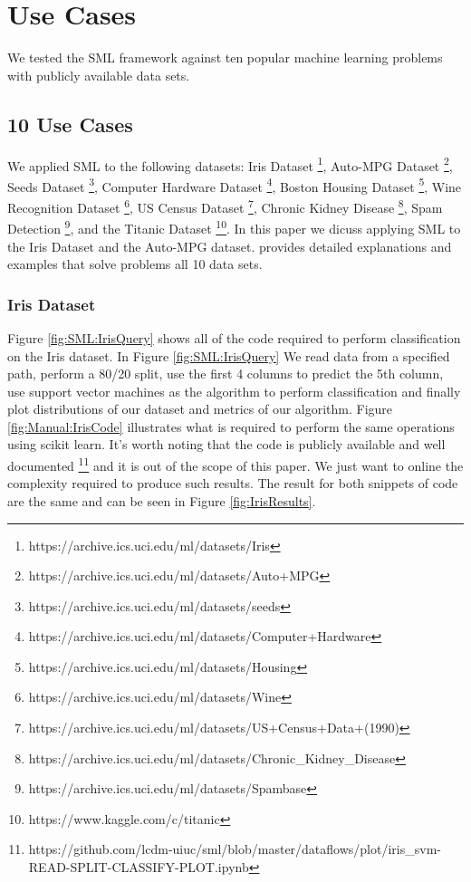 \documentclass[jair,twoside,11pt,theapa]{article}
\begin{document}
\section{Use Cases}
\label{use-cases}

We tested the SML framework against ten popular machine learning problems with publicly available data sets.

\subsection{10 Use Cases}
We applied SML to the following datasets: Iris Dataset \footnote{https://archive.ics.uci.edu/ml/datasets/Iris}, Auto-MPG Dataset \footnote{https://archive.ics.uci.edu/ml/datasets/Auto+MPG}, Seeds Dataset \footnote{https://archive.ics.uci.edu/ml/datasets/seeds}, Computer Hardware Dataset \footnote{https://archive.ics.uci.edu/ml/datasets/Computer+Hardware}, Boston Housing Dataset \footnote{https://archive.ics.uci.edu/ml/datasets/Housing}, Wine Recognition Dataset \footnote{https://archive.ics.uci.edu/ml/datasets/Wine}, US Census Dataset \footnote{https://archive.ics.uci.edu/ml/datasets/US+Census+Data+(1990)}, Chronic Kidney Disease \footnote{https://archive.ics.uci.edu/ml/datasets/Chronic\_Kidney\_Disease}, Spam Detection \footnote{https://archive.ics.uci.edu/ml/datasets/Spambase}, and the Titanic Dataset \footnote{https://www.kaggle.com/c/titanic}. In this paper we dicuss applying SML to the Iris Dataset and the Auto-MPG dataset. \cite{Github:DataFlows} provides detailed explanations and examples that solve problems all 10 data sets.

\subsubsection{Iris Dataset}
Figure \ref{fig:SML:IrisQuery} shows all of the code required to perform classification on the Iris dataset. In Figure \ref{fig:SML:IrisQuery} We read data from a specified path, perform a 80/20 split, use the first 4 columns to predict the 5th column, use support vector machines as the algorithm to perform classification and finally plot distributions of our dataset  and metrics of our algorithm. Figure \ref{fig:Manual:IrisCode} illustrates what is required to perform the same operations using scikit learn. It's worth noting that the code is publicly available and well documented \footnote{https://github.com/lcdm-uiuc/sml/blob/master/dataflows/plot/iris\_svm-READ-SPLIT-CLASSIFY-PLOT.ipynb} and it is out of the scope of this paper. We just want to online the complexity required to produce such results. The result for both snippets of code are the same and can be seen in Figure \ref{fig:IrisResults}.
\end{document}
